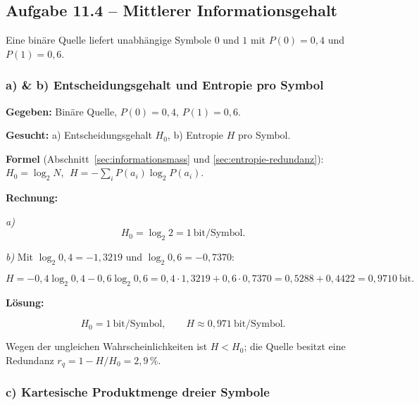 \subsection*{Aufgabe 11.4 – Mittlerer Informationsgehalt}

Eine binäre Quelle liefert unabhängige Symbole $0$ und $1$ mit
$P(0) = 0{,}4$ und $P(1) = 0{,}6$.

\subsubsection*{a) \& b) Entscheidungsgehalt und Entropie pro Symbol}

\begin{beispiel}

\textbf{Gegeben:} Binäre Quelle, $P(0) = 0{,}4$, $P(1) = 0{,}6$.

\textbf{Gesucht:} a) Entscheidungsgehalt $H_0$, b) Entropie $H$ pro Symbol.

\textbf{Formel} (Abschnitt~\ref{sec:informationsmass} und
\ref{sec:entropie-redundanz}):
$H_0 = \log_2 N$, $\;H = -\sum_i P(a_i)\log_2 P(a_i)$.

\textbf{Rechnung:}

\emph{a)}
$$
H_0 = \log_2 2 = 1\ \text{bit/Symbol}.
$$

\emph{b)} Mit $\log_2 0{,}4 = -1{,}3219$ und $\log_2 0{,}6 = -0{,}7370$:

$$
H = -0{,}4\log_2 0{,}4 - 0{,}6\log_2 0{,}6
= 0{,}4\cdot 1{,}3219 + 0{,}6\cdot 0{,}7370
= 0{,}5288 + 0{,}4422 = 0{,}9710\ \text{bit}.
$$

\textbf{Lösung:}

$$
\boxed{\;H_0 = 1\ \text{bit/Symbol}, \qquad H \approx 0{,}971\ \text{bit/Symbol}.\;}
$$

Wegen der ungleichen Wahrscheinlichkeiten ist $H < H_0$; die Quelle besitzt eine
Redundanz $r_q = 1 - H/H_0 = 2{,}9\,\%$.

\end{beispiel}

\subsubsection*{c) Kartesische Produktmenge dreier Symbole}

